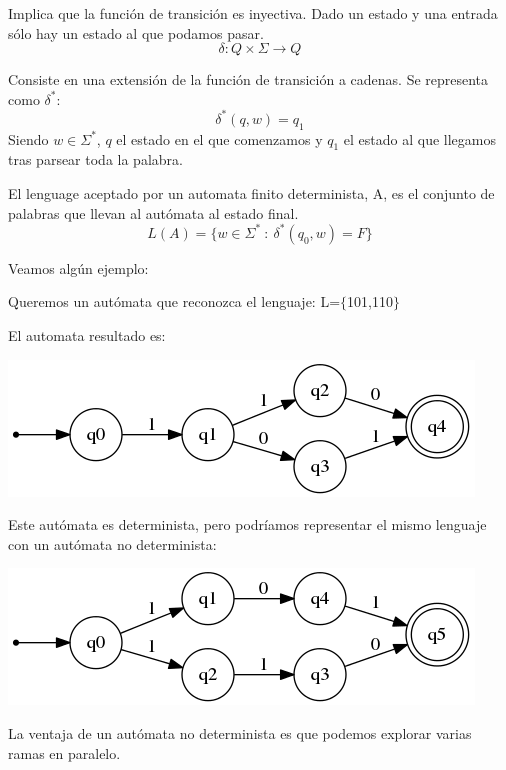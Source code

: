 \documentclass{apuntes}
\begin{document}
\begin{defn}
Implica que la función de transición es inyectiva. Dado un estado y una entrada sólo hay un estado al que podamos pasar.
\[\delta: Q \times \Sigma \rightarrow Q\]
\end{defn}

\begin{defn}
Consiste en una extensión de la función de transición a cadenas. Se representa como $\delta ^*$:
\[\delta^*(q, w)=q_1\]
Siendo $w\in \Sigma ^*$, $q$ el estado en el que comenzamos y $q_1$ el estado al que llegamos tras parsear toda la palabra.
\end{defn}

\newpage

\begin{defn}
El lenguage aceptado por un automata finito determinista, A, es el conjunto de palabras que llevan al autómata al estado final.
\[L(A) = \lbrace w \in \Sigma^* \ : \ \delta^*(q_0, w) = F \rbrace\]
\end{defn}

Veamos algún ejemplo:
\begin{example} 
Queremos un autómata que reconozca el lenguaje: L=$\lbrace$101,110$\rbrace$

El automata resultado es:
\begin{center}
\includegraphics[scale=0.75]{automata2.png}
\end{center}

Este autómata es determinista, pero podríamos representar el mismo lenguaje con un autómata no determinista:

\begin{center}
\includegraphics[scale=0.75]{automata3.png}
\end{center}

La ventaja de un autómata no determinista es que podemos explorar varias ramas en paralelo.
\end{example}
\end{document}
